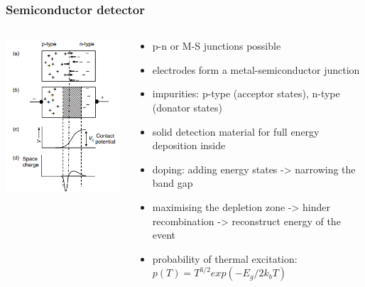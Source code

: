 \documentclass[aspectratio=1610, 9pt]{beamer}
\begin{document}
\begin{frame}\frametitle{Semiconductor detector}
  \begin{columns}
    \begin{column}[c]{0.48\textwidth}
      \includegraphics[width=\textwidth]{plots/junction.png}
    \end{column}
    \begin{column}[c]{0.48\textwidth}
      \begin{itemize}
        \item p-n or M-S junctions possible
        \item electrodes form a metal-semiconductor junction
        \item impurities: p-type (acceptor states), n-type (donator states)
        \item solid detection material for full energy deposition inside
        \item doping: adding energy states -> narrowing the band gap
        \item maximising the depletion zone -> hinder recombination -> reconstruct energy of the event
        \item probability of thermal excitation: $p(T) = T^{3/2} exp(-E_g / 2 k_b T)$
      \end{itemize}
    \end{column}
  \end{columns}
\end{frame}
\end{document}
